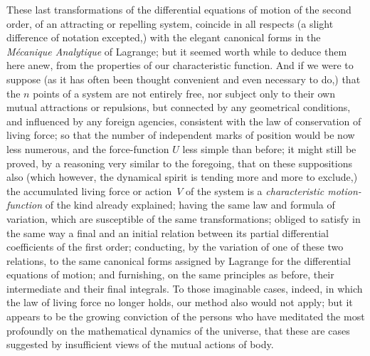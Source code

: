 These last transformations of the differential equations of
motion of the second order, of an attracting or repelling system,
coincide in all respects (a slight difference of notation
excepted,) with the elegant canonical forms in the
{\it M\'{e}canique Analytique\/} of {\sc Lagrange}; but it seemed
worth while to deduce them here anew, from the properties of our
characteristic function.  And if we were to suppose (as it has
often been thought convenient and even necessary to do,) that the
$n$ points of a system are not entirely free, nor subject only to
their own mutual attractions or repulsions, but connected by any
geometrical conditions, and influenced by any foreign agencies,
consistent with the law of conservation of living force; so that
the number of independent marks of position would be now less
numerous, and the force-function $U$ less simple than before; it
might still be proved, by a reasoning very similar to the foregoing,
that on these suppositions also (which however, the dynamical
spirit is tending more and more to exclude,) the accumulated
living force or action~$V$ of the system is a {\it characteristic
motion-function\/} of the kind already explained; having the same
law and formula of variation, which are susceptible of the same
transformations; obliged to satisfy in the same way a final and
an initial relation between its partial differential coefficients
of the first order; conducting, by the variation of one of these
two relations, to the same canonical forms assigned by {\sc Lagrange}
for the differential equations of motion; and furnishing, on the
same principles as before, their intermediate and their final
integrals.  To those imaginable cases, indeed, in which the law of
living force no longer holds, our method also would not apply;
but it appears to be the growing conviction of the persons who
have meditated the most profoundly on the mathematical dynamics
of the universe, that these are cases suggested by insufficient
views of the mutual actions of body.

\bigbreak

